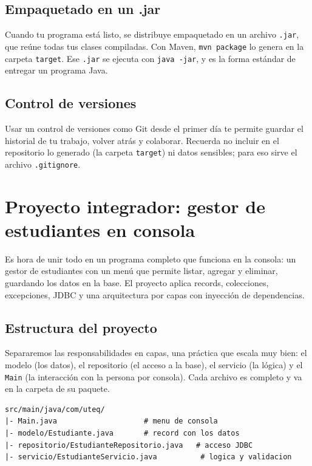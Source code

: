 \documentclass[11pt]{article}
\begin{document}
\subsection{Empaquetado en un .jar}
Cuando tu programa está listo, se distribuye empaquetado en un archivo \texttt{.\allowbreak{}jar}, que reúne todas tus clases compiladas. Con Maven, \texttt{mvn package} lo genera en la carpeta \texttt{target}. Ese \texttt{.\allowbreak{}jar} se ejecuta con \texttt{java -jar}, y es la forma estándar de entregar un programa Java.

\subsection{Control de versiones}
Usar un control de versiones como Git desde el primer día te permite guardar el historial de tu trabajo, volver atrás y colaborar. Recuerda no incluir en el repositorio lo generado (la carpeta \texttt{target}) ni datos sensibles; para eso sirve el archivo \texttt{.\allowbreak{}gitignore}.

\section{Proyecto integrador: gestor de estudiantes en consola}
Es hora de unir todo en un programa completo que funciona en la consola: un gestor de estudiantes con un menú que permite listar, agregar y eliminar, guardando los datos en la base. El proyecto aplica records, colecciones, excepciones, JDBC y una arquitectura por capas con inyección de dependencias.

\subsection{Estructura del proyecto}
Separaremos las responsabilidades en capas, una práctica que escala muy bien: el modelo (los datos), el repositorio (el acceso a la base), el servicio (la lógica) y el \texttt{Main} (la interacción con la persona por consola). Cada archivo es completo y va en la carpeta de su paquete.

\begin{cajacodigo}
\begin{lstlisting}[style=markup]
src/main/java/com/uteq/
|- Main.java                    # menu de consola
|- modelo/Estudiante.java       # record con los datos
|- repositorio/EstudianteRepositorio.java   # acceso JDBC
|- servicio/EstudianteServicio.java          # logica y validacion
\end{lstlisting}
\end{cajacodigo}
\vspace{2pt}
\end{document}
